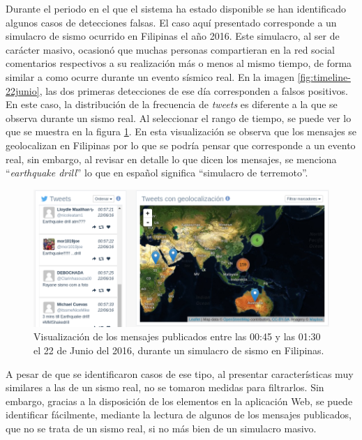 	Durante el periodo en el que el sistema ha estado disponible se han identificado algunos casos de detecciones falsas. El caso aquí presentado corresponde a un simulacro de sismo ocurrido en Filipinas el año 2016. Este simulacro, al ser de carácter masivo, ocasionó que muchas personas compartieran en la red social comentarios respectivos a su realización más o menos al mismo tiempo, de forma similar a como ocurre durante un evento sísmico real. En la imagen \ref{fig:timeline-22junio}, las dos primeras detecciones de ese día corresponden a falsos positivos. En este caso, la distribución de la frecuencia de \textit{tweets} es diferente a la que se observa durante un sismo real. Al seleccionar el rango de tiempo, se puede ver lo que se muestra en la figura \ref{fig:earthquakedrill}. En esta visualización se observa que los mensajes se geolocalizan en Filipinas por lo que se podría pensar que corresponde a un evento real, sin embargo, al revisar en detalle lo que dicen los mensajes, se menciona ``\textit{earthquake drill}'' lo que en español significa ``simulacro de terremoto''. 
	
	\begin{figure}[h]
	  \centering
	  \includegraphics[width=\textwidth]{imagenes/earthquakedrill.png}
	  \caption{Visualización de los mensajes publicados entre las 00:45 y las 01:30 el 22 de Junio del 2016, durante un simulacro de sismo en Filipinas.}
		\label{fig:earthquakedrill}
	\end{figure}	
	
	A pesar de que se identificaron casos de ese tipo, al presentar características muy similares a las de un sismo real, no se tomaron medidas para filtrarlos. Sin embargo, gracias a la disposición de los elementos en la aplicación Web, se puede identificar fácilmente, mediante la lectura de algunos de los mensajes publicados, que no se trata de un sismo real, si no más bien de un simulacro masivo. 
	
